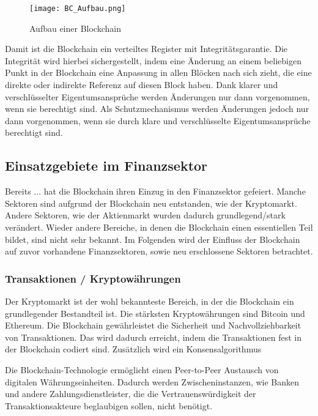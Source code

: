 \begin{figure}[!h]
    \texttt{[image: BC\_Aufbau.png]}
    \caption{Aufbau einer Blockchain}
    \label{fig:BC_Aufbau}
\end{figure}

Damit ist die Blockchain ein verteiltes Register mit Integritätsgarantie. Die Integrität 
wird hierbei sichergestellt, indem eine Änderung an einem beliebigen Punkt in der
Blockchain eine Anpassung in allen Blöcken nach sich zieht, die eine direkte oder
indirekte Referenz auf diesen Block haben. Dank klarer und verschlüsselter Eigentumsansprüche
werden Änderungen nur dann vorgenommen, wenn sie berechtigt sind.
Als Schutzmechanismus werden Änderungen jedoch nur dann vorgenommen, wenn sie durch klare
und verschlüsselte Eigentumsansprüche berechtigt sind.
\cite[p.~22]{fill2020blockchain} 


\subsection{Einsatzgebiete im Finanzsektor}
Bereits ... hat die Blockchain ihren Einzug in den Finanzsektor gefeiert. Manche
Sektoren sind aufgrund der Blockchain neu entstanden, wie der Kryptomarkt. Andere Sektoren,
wie der Aktienmarkt wurden dadurch grundlegend/stark verändert. Wieder andere Bereiche, in denen die Blockchain
einen essentiellen Teil bildet, sind nicht sehr bekannt. Im Folgenden wird der Einfluss
der Blockchain auf zuvor vorhandene Finanzsektoren, sowie neu erschlossene Sektoren 
betrachtet.

\subsubsection{Transaktionen / Kryptowährungen}
Der Kryptomarkt ist der wohl bekannteste Bereich, in der die Blockchain ein 
grundlegender Bestandteil ist. 
Die stärksten Kryptowährungen sind Bitcoin und Ethereum. 
Die Blockchain gewährleistet die Sicherheit und Nachvollziehbarkeit von Transaktionen.
\cite[p.~168]{chowdhary2025smart}
Das wird dadurch erreicht, indem die Transaktionen fest in der Blockchain codiert sind.
 \cite[p.~11f]{pirafelnerblockchaintechnologie}
 Zusätzlich wird ein Konsensalgorithmus
 \cite[p.~32]{fill2020blockchain}

Die Blockchain-Technologie ermöglicht einen Peer-to-Peer Austausch von digitalen
Währungseinheiten. Dadurch werden Zwischeninstanzen, wie Banken und andere Zahlungsdienstleister,
die die Vertrauenswürdigkeit der Transaktionsakteure beglaubigen sollen, nicht benötigt.
\cite[p.~32]{fill2020blockchain}



